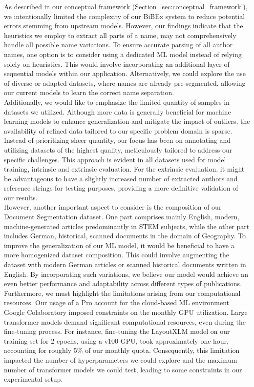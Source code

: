 As described in our conceptual framework (Section~\ref{sec:conceptual_framework}), we intentionally limited the complexity of our BiBEx system to reduce potential errors stemming from upstream models. However, our findings indicate that the heuristics we employ to extract all parts of a name, may not comprehensively handle all possible name variations. To ensure accurate parsing of all author names, one option is to consider using a dedicated ML model instead of relying solely on heuristics. This would involve incorporating an additional layer of sequential models within our application. Alternatively, we could explore the use of diverse or adapted datasets, where names are already pre-segmented, allowing our current models to learn the correct name separation.\\
Additionally, we would like to emphasize the limited quantity of samples in datasets we utilized. Although more data is generally beneficial for machine learning models to enhance generalization and mitigate the impact of outliers, the availability of refined data tailored to our specific problem domain is sparse. Instead of prioritizing sheer quantity, our focus has been on annotating and utilizing datasets of the highest quality, meticulously tailored to address our specific challenges. This approach is evident in all datasets used for model training, intrinsic and extrinsic evaluation. For the extrinsic evaluation, it might be advantageous to have a slightly increased number of extracted authors and reference strings for testing purposes, providing a more definitive validation of our results.\\
However, another important aspect to consider is the composition of our Document Segmentation dataset. One part comprises mainly English, modern, machine-generated articles predominantly in STEM subjects, while the other part includes German, historical, scanned documents in the domain of Geography. To improve the generalization of our ML model, it would be beneficial to have a more homogenized dataset composition. This could involve augmenting the dataset with modern German articles or scanned historical documents written in English. By incorporating such variations, we believe our model would achieve an even better performance and adaptability across different types of publications.\\
Furthermore, we must highlight the limitations arising from our computational resources. Our usage of a Pro account for the cloud-based ML environment Google Colaboratory imposed constraints on the monthly GPU utilization. Large transformer models demand significant computational resources, even during the fine-tuning process. For instance, fine-tuning the LayoutXLM model on our training set for 2 epochs, using a v100 GPU, took approximately one hour, accounting for roughly 5\% of our monthly quota. Consequently, this limitation impacted the number of hyperparameters we could explore and the maximum number of transformer models we could test, leading to some constraints in our experimental setup.